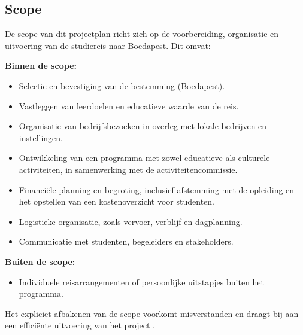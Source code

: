\subsection{Scope}

De scope van dit projectplan richt zich op de voorbereiding, organisatie en uitvoering van de studiereis naar Boedapest. Dit omvat:

\textbf{Binnen de scope:}

\begin{itemize}
	\item Selectie en bevestiging van de bestemming (Boedapest).
	\item Vastleggen van leerdoelen en educatieve waarde van de reis.
	\item Organisatie van bedrijfsbezoeken in overleg met lokale bedrijven en instellingen.
	\item Ontwikkeling van een programma met zowel educatieve als culturele activiteiten, in samenwerking met de activiteitencommissie.
	\item Financiële planning en begroting, inclusief afstemming met de opleiding en het opstellen van een kostenoverzicht voor studenten.
	\item Logistieke organisatie, zoals vervoer, verblijf en dagplanning.
	\item Communicatie met studenten, begeleiders en stakeholders.
\end{itemize}

\textbf{Buiten de scope:}

\begin{itemize}
	\item Individuele reisarrangementen of persoonlijke uitstapjes buiten het programma.
\end{itemize}

\noindent Het expliciet afbakenen van de scope voorkomt misverstanden en draagt bij aan een efficiënte uitvoering van het project \cite{pmibook2021}.